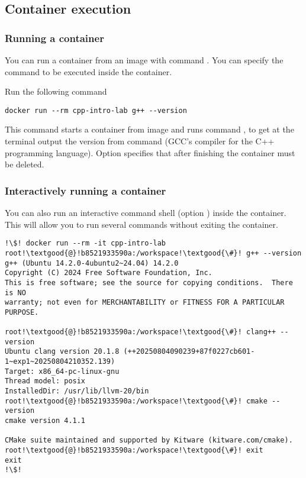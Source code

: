\subsection{Container execution}

\subsubsection{Running a container}

You can run a container from an image with command
. 
You can specify the command to be executed inside the container.

Run the following command

\begin{lstlisting}[style=terminal]
docker run --rm cpp-intro-lab g++ --version
\end{lstlisting}

This command starts a container from image 
and runs command , 
to get at the terminal output the version from command  
(GCC's compiler for the C++ programming language).
Option 
specifies that after finishing the container must be deleted.

\subsubsection{Interactively running a container}

You can also run an interactive command shell
(option ) inside the container.
This will allow you to run several commands without exiting the container.

\begin{lstlisting}[style=terminal,escapechar=!]
!\$! docker run --rm -it cpp-intro-lab
root!\textgood{@}!b8521933590a:/workspace!\textgood{\#}! g++ --version
g++ (Ubuntu 14.2.0-4ubuntu2~24.04) 14.2.0
Copyright (C) 2024 Free Software Foundation, Inc.
This is free software; see the source for copying conditions.  There is NO
warranty; not even for MERCHANTABILITY or FITNESS FOR A PARTICULAR PURPOSE.

root!\textgood{@}!b8521933590a:/workspace!\textgood{\#}! clang++ --version
Ubuntu clang version 20.1.8 (++20250804090239+87f0227cb601-1~exp1~20250804210352.139)
Target: x86_64-pc-linux-gnu
Thread model: posix
InstalledDir: /usr/lib/llvm-20/bin
root!\textgood{@}!b8521933590a:/workspace!\textgood{\#}! cmake --version
cmake version 4.1.1

CMake suite maintained and supported by Kitware (kitware.com/cmake).
root!\textgood{@}!b8521933590a:/workspace!\textgood{\#}! exit
exit
!\$!
\end{lstlisting}

